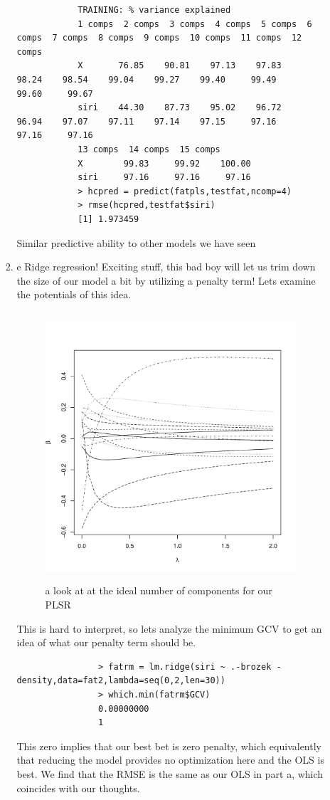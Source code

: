 \documentclass[11pt]{article}
\begin{document}
\begin{enumerate}
\begin{enumerate}
\begin{enumerate}
\begin{verbatim}
			TRAINING: % variance explained
			1 comps  2 comps  3 comps  4 comps  5 comps  6 comps  7 comps  8 comps  9 comps  10 comps  11 comps  12 comps
			X       76.85    90.81    97.13    97.83    98.24    98.54    99.04    99.27    99.40     99.49     99.60     99.67
			siri    44.30    87.73    95.02    96.72    96.94    97.07    97.11    97.14    97.15     97.16     97.16     97.16
			13 comps  14 comps  15 comps
			X        99.83     99.92    100.00
			siri     97.16     97.16     97.16
			> hcpred = predict(fatpls,testfat,ncomp=4)
			> rmse(hcpred,testfat$siri)
			[1] 1.973459
		\end{verbatim}
		Similar predictive ability to other models we have seen
		\item e
		Ridge regression! Exciting stuff, this bad boy will let us trim down the size of our model a bit by utilizing a penalty term! Lets examine the potentials of this idea.
			\begin{figure}[H]
				\centering
				\includegraphics[width=10cm,height=10cm]{fatrgp.pdf}
				\caption[fr]{a look at at the ideal number of components for our PLSR}
				\label{fatridge}
			\end{figure}
			This is hard to interpret, so lets analyze the minimum GCV to get an idea of what our penalty term should be.
			\begin{verbatim}
				> fatrm = lm.ridge(siri ~ .-brozek -density,data=fat2,lambda=seq(0,2,len=30))
				> which.min(fatrm$GCV)
				0.00000000 
				1 
			\end{verbatim}
			This zero implies that our best bet is zero penalty, which equivalently that reducing the model provides no optimization here and the OLS is best. We find that the RMSE is the same as our OLS in part a, which coincides with our thoughts.

\end{enumerate}
\end{enumerate}
\end{enumerate}
\end{document}
